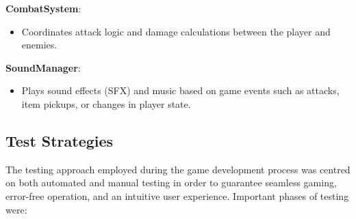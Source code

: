 \textbf{CombatSystem}:
\begin{itemize}
	\item Coordinates attack logic and damage calculations between the player and enemies.
\end{itemize}

\textbf{SoundManager}:
\begin{itemize}
	\item Plays sound effects (SFX) and music based on game events such as attacks, item pickups, or changes in player state.
	\end{itemize}
	

\subsection{Test Strategies}
The testing approach employed during the game development process was centred on both automated and manual testing in order to guarantee seamless gaming, error-free operation, and an intuitive user experience. Important phases of testing were:

